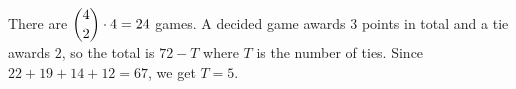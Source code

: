 There are $\dbinom42\cdot4=24$ games. A decided game awards $3$ points in total and a tie awards $2$, so the total is $72-T$ where $T$ is the number of ties. Since $22+19+14+12=67$, we get $T=\boxed{5}$.
